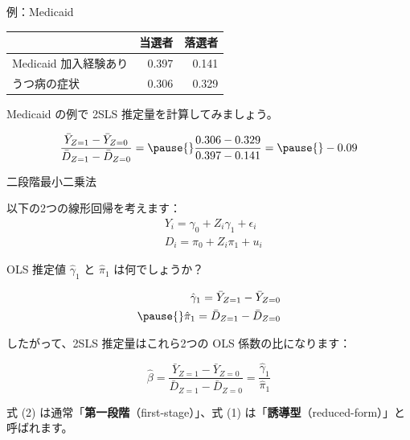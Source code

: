 \documentclass[11pt,handout]{beamer}
\newenvironment{wideitemize}{\itemize\addtolength{\itemsep}{10pt}}{\enditemize}
\begin{document}
\begin{frame}{例：Medicaid}
			\begin{tabular}{lrr}
	& 当選者 & 落選者 \\ \hline
	Medicaid 加入経験あり & 0.397 & 0.141 \\
	うつ病の症状 & 0.306 &  0.329 
\end{tabular}

\bigskip 
\begin{wideitemize}
	\item
	Medicaid の例で 2SLS 推定量を計算してみましょう。
	
	\pause
	$$ \dfrac{  \bar{Y}_{Z=1} - \bar{Y}_{Z=0}   }{ \bar{D}_{Z=1} - \bar{D}_{Z=0} }  = \pause{} \frac{0.306 - 0.329}{0.397 - 0.141}  = \pause{} -0.09$$
	
\end{wideitemize}


\end{frame}



\begin{frame}{二段階最小二乗法}

\begin{wideitemize}
	\item
	以下の2つの線形回帰を考えます：
	\begin{align}
		&Y_{i} = \gamma_0 +   Z_i \gamma_1 + \epsilon_{i} \\
		&D_i = \pi_0 + Z_i \pi_1 + u_i
	\end{align}

	\item
	OLS 推定値 $\hat\gamma_1$ と $\hat\pi_1$ は何でしょうか？
	
	\pause
	\begin{align*}
		\hat\gamma_1 = \bar{Y}_{Z=1} - \bar{Y}_{Z=0} \\ \pause{}
		\hat\pi_1 = \bar{D}_{Z=1} - \bar{D}_{Z=0}
	\end{align*}

	
	\pause
	\item
	したがって、2SLS 推定量はこれら2つの OLS 係数の比になります：
	
	$$\hat\beta =  \dfrac{  \bar{Y}_{Z=1} - \bar{Y}_{Z=0}   }{ \bar{D}_{Z=1} - \bar{D}_{Z=0} } = \frac{\hat\gamma_1}{\hat\pi_1} $$
	
	
	\pause
	\item
	式 (2) は通常「\textbf{第一段階}（first-stage）」、式 (1) は「\textbf{誘導型}（reduced-form）」と呼ばれます。
\end{wideitemize}	
	
\end{frame}
\end{document}
